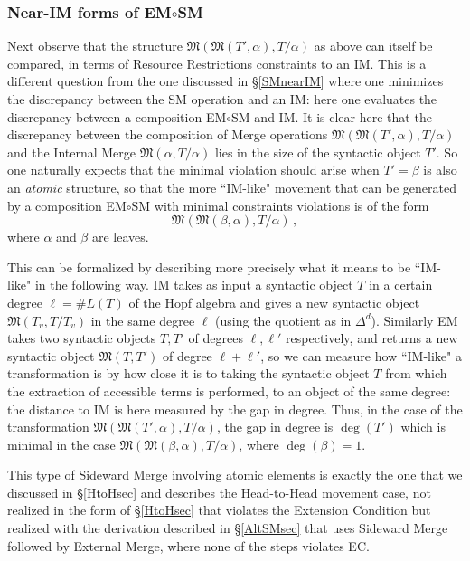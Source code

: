 \documentclass[12pt]{amsart}
\numberwithin{equation}{section}
\def\fM{{\mathfrak M}}
\begin{document}
\subsubsection{Near-IM forms of EM$\circ$SM}

Next observe that the structure 
$\fM( \fM(T', \alpha), T/\alpha )$ as above
can itself be compared, in terms of Resource Restrictions constraints
to an IM. This is a different question from the one discussed
in \S \ref{SMnearIM} where one minimizes the discrepancy
between the SM operation and an IM: here one evaluates
the discrepancy between a composition EM$\circ$SM and IM. 
It is clear here that the discrepancy between the composition
of Merge operations $\fM( \fM(T', \alpha), T/\alpha )$ and
the Internal Merge $\fM(\alpha, T/\alpha)$ lies in the size
of the syntactic object $T'$. So one naturally expects that
the minimal violation should arise when $T'=\beta$ is also
an {\em atomic} structure, so that 
the more ``IM-like" movement that can be generated 
by a composition EM$\circ$SM with minimal constraints
violations is of the form
$$ \fM( \fM(\beta, \alpha), T/\alpha )\, ,  $$
where $\alpha$ and $\beta$ are leaves.

This can be formalized by describing more precisely what 
it means to be ``IM-like"  in the following way.
IM takes as input a syntactic object $T$ in a
certain degree $\ell =\# L(T)$ of the Hopf
algebra and gives a new syntactic object $\fM(T_v, T/T_v)$
in the same degree $\ell$ (using the quotient as in $\Delta^d$).
Similarly EM takes two syntactic objects $T,T'$ of
degrees $\ell, \ell'$ respectively, and returns a new
syntactic object $\fM(T,T')$ of degree $\ell+\ell'$, so
we can measure how ``IM-like" a transformation is
by how close it is to taking the syntactic object $T$ from
which the extraction of accessible terms is performed,
to an object of the same degree: the distance to IM
is here measured by the gap in degree. Thus, in
the case of the transformation
$\fM( \fM(T', \alpha), T/\alpha )$,
the gap in degree is $\deg(T')$ which is minimal
in the case
$\fM( \fM(\beta, \alpha), T/\alpha )$, 
where $\deg(\beta)=1$.
 
This type of Sideward Merge involving atomic elements
is exactly the one that we discussed in \S \ref{HtoHsec}
and describes the Head-to-Head movement case,
not realized in the form of \S \ref{HtoHsec} that violates the Extension Condition
but realized with the derivation described in \S \ref{AltSMsec} that uses
Sideward Merge followed by External Merge, 
where none of the steps violates EC. 
\end{document}
